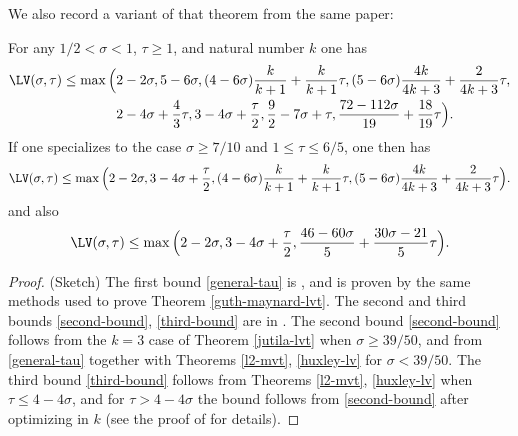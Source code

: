 We also record a variant of that theorem from the same paper:

\begin{theorem}\label{guth-maynard-extra} For any $1/2 < \sigma < 1$, $\tau \geq 1$, and natural number $k$ one has
    \begin{equation}\label{general-tau}
    \begin{split}
        \LV(\sigma,\tau) \leq \max\Big(&2-2\sigma, 5-6\sigma, (4-6\sigma)\frac{k}{k+1} + \frac{k}{k+1} \tau, (5-6\sigma) \frac{4k}{4k+3} + \frac{2}{4k+3} \tau, \\
        &2-4\sigma + \frac{4}{3} \tau, 3-4\sigma+ \frac{\tau}{2}, \frac{9}{2}-7\sigma+\tau, \frac{72-112\sigma}{19} + \frac{18}{19} \tau\Big).
    \end{split}
    \end{equation}
If one specializes to the case $\sigma \geq 7/10$ and $1 \leq \tau \leq 6/5$, one then has
    \begin{equation}\label{second-bound} \LV(\sigma,\tau) \leq \max\Big(2-2\sigma, 3-4\sigma+\frac{\tau}{2}, (4-6\sigma)\frac{k}{k+1} + \frac{k}{k+1} \tau, (5-6\sigma) \frac{4k}{4k+3} + \frac{2}{4k+3} \tau\Big).
    \end{equation}
and also
\begin{equation}\label{third-bound}
     \LV(\sigma,\tau) \leq \max\Big(2-2\sigma, 3-4\sigma+\frac{\tau}{2}, \frac{46-60\sigma}{5} + \frac{30\sigma-21}{5} \tau\Big).
\end{equation}
\end{theorem}

\literature
{}
\derived
{}

\begin{proof}
(Sketch) The first bound \eqref{general-tau} is \cite[(12.1)]{guth-maynard}, and is proven by the same methods used to prove Theorem \ref{guth-maynard-lvt}.  The second and third bounds \eqref{second-bound}, \eqref{third-bound} are in \cite[Proposition 12.1]{guth-maynard}.  The second bound \eqref{second-bound} follows from the $k=3$ case of Theorem \ref{jutila-lvt} when $\sigma \geq 39/50$, and from \eqref{general-tau} together with Theorems \ref{l2-mvt}, \ref{huxley-lv} for $\sigma < 39/50$.  The third bound \eqref{third-bound} follows from Theorems \ref{l2-mvt}, \ref{huxley-lv} when $\tau \leq 4-4\sigma$, and for $\tau > 4-4\sigma$
the bound follows from \eqref{second-bound} after optimizing in $k$ (see the proof of \cite[Proposition 12.1]{guth-maynard} for details).
\end{proof}

